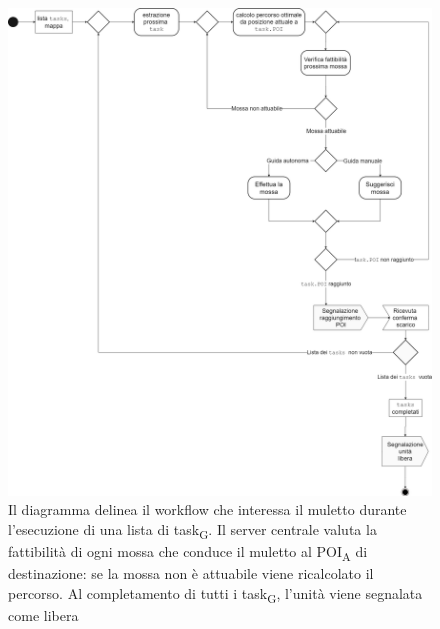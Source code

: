 \begin{figure}[H]
	\centering
	\includegraphics[scale=0.37]{res/images/diagramma_di_attivita2.png}
	\caption[Diagramma di attivita\textsubscript{G} per l'evasione di una lista di task\textsubscript{G} da parte di un muletto]{Il diagramma delinea il workflow che interessa il muletto durante l'esecuzione di una lista di task\textsubscript{G}. Il server centrale valuta la fattibilità di ogni mossa che conduce il muletto al POI\textsubscript{A} di destinazione: se la mossa non è attuabile viene ricalcolato il percorso. Al completamento di tutti i task\textsubscript{G}, l'unità viene segnalata come libera}
\end{figure}






